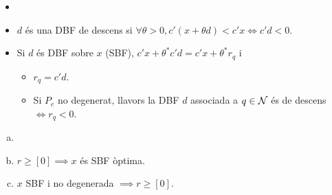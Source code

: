 \begin{defi}
    \begin{itemize}
        \item[]
        \item $d$ és una DBF de descens si $\forall \theta > 0, c'\left(x + \theta d\right) < c'x \iff c'd < 0$.
        \item Si $d$ és DBF sobre $x$ (SBF), $c'x + \theta^*c'd = c'x + \theta^*r_q$ i
            \begin{itemize}
                \item $r_q = c'd$.
                \item Si $P_e$ no degenerat, llavors la DBF $d$ associada a $q \in \mathcal{N}$ és de descens $\iff r_q < 0$.
            \end{itemize}
    \end{itemize}
\end{defi}
\begin{teo*}
    \begin{enumerate}[a)]
        \item[]
        \item $r \geq \left[0\right] \implies x$ és SBF òptima.
        \item $x$ SBF i no degenerada $\implies r \geq \left[0\right]$.
    \end{enumerate}
\end{teo*}
